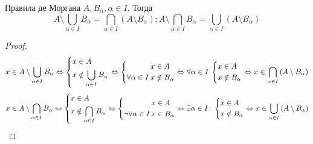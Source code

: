 \begin{theorem}{Правила де Моргана}
$ A, B_\alpha, \alpha \in I $.
Тогда 
$$ A \setminus \bigcup_{\alpha \in I} B_\alpha = \bigcap_{\alpha \in I} \left(A \setminus B_\alpha\right) ; 
A \setminus \bigcap_{\alpha \in I} B_\alpha = \bigcup_{\alpha \in I} \left(A \setminus B_\alpha\right) $$
\end{theorem} 
\begin{proof}
$$
x \in A \mathbin{\backslash} \bigcup_{\alpha \in I} B_{\alpha} \Leftrightarrow \left\{\begin{aligned}x &\in A \\ x &\notin \bigcup_{\alpha \in I} B_{\alpha}\end{aligned}\right. \Leftrightarrow 
\left\{\begin{aligned} x &\in A \\ \forall \alpha \in I\: x &\notin B_\alpha \end{aligned}\right. \Leftrightarrow
\forall \alpha \in I\: \left\{\begin{aligned} x &\in A \\ x &\notin B_\alpha \end{aligned}\right.  
\Leftrightarrow x \in \bigcap_{\alpha \in I} \left(A \mathbin{\backslash} B_\alpha\right) 
$$
$$
x \in A \mathbin{\backslash} \bigcap_{\alpha \in I} B_{\alpha} \Leftrightarrow \left\{\begin{aligned}x &\in A \\ x &\notin \bigcap_{\alpha \in I} B_{\alpha}\end{aligned}\right. \Leftrightarrow 
\left\{\begin{aligned} x &\in A \\ \lnot \forall \alpha \in I\: x &\in B_\alpha \end{aligned}\right. \Leftrightarrow
\exists \alpha \in I\colon \left\{\begin{aligned} x &\in A \\ x &\notin B_\alpha \end{aligned}\right.  
\Leftrightarrow x \in \bigcup_{\alpha \in I} \left(A \mathbin{\backslash} B_\alpha\right) 
$$
\end{proof}


